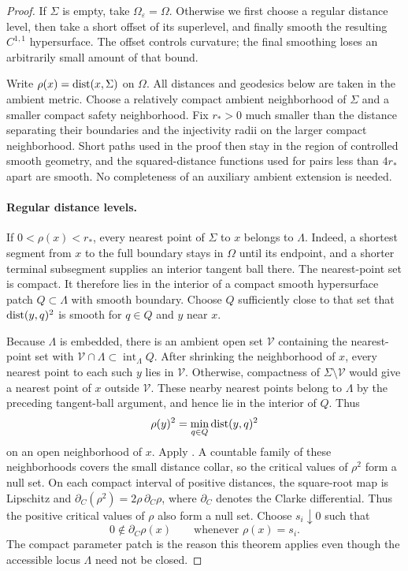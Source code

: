 \begin{proof}
If $\Sigma$ is empty, take $\Omega_\varepsilon=\Omega$.
Otherwise we first choose a regular distance level, then take a short offset
of its superlevel, and finally smooth the resulting $C^{1,1}$
hypersurface. The offset controls curvature; the final smoothing
loses an arbitrarily small amount of that bound.

Write $\rho(x)=\operatorname{dist}(x,\Sigma)$ on $\Omega$. All distances and
geodesics below are taken in the ambient metric. Choose a relatively
compact ambient neighborhood of $\Sigma$ and a smaller compact safety
neighborhood. Fix $r_*>0$ much smaller than the distance separating
their boundaries and the injectivity radii on the larger compact
neighborhood. Short paths used in the proof then stay in the region
of controlled smooth geometry, and the squared-distance functions
used for pairs less than $4r_*$ apart are smooth. No completeness of
an auxiliary ambient extension is needed.

\paragraph{Regular distance levels.}
If $0<\rho(x)<r_*$, every nearest point of $\Sigma$ to $x$ belongs to
$\Lambda$. Indeed, a shortest segment from $x$ to the full boundary
stays in $\Omega$ until its endpoint, and a shorter terminal subsegment
supplies an interior tangent ball there. The nearest-point set is
compact. It therefore lies in the interior of a compact smooth
hypersurface patch $Q\subset\Lambda$ with smooth boundary. Choose
$Q$ sufficiently close to that set that
$\operatorname{dist}(y,q)^2$ is smooth for $q\in Q$ and $y$ near $x$.

Because $\Lambda$ is embedded, there is an ambient open set
$\mathcal V$ containing the nearest-point set with
$\mathcal V\cap\Lambda\subset\operatorname{int}_{\Lambda}Q$.
After shrinking the neighborhood of $x$, every nearest point to each
such $y$ lies in $\mathcal V$. Otherwise, compactness of
$\Sigma\setminus\mathcal V$ would give a nearest point of $x$
outside $\mathcal V$. These nearby nearest points belong to
$\Lambda$ by the preceding tangent-ball argument, and hence lie
in the interior of $Q$. Thus
\[
 \rho(y)^2=\min_{q\in Q}\operatorname{dist}(y,q)^2
\]
on an open neighborhood of $x$. Apply
\cite[Theorem~3 and the compact-parameter-with-boundary extension
in the proof of Theorem~1]{Rifford2004}. A countable family of these
neighborhoods covers the small distance collar, so the critical
values of $\rho^2$ form a null set. On each compact interval of
positive distances, the square-root map is Lipschitz and
$\partial_C(\rho^2)=2\rho\,\partial_C\rho$, where $\partial_C$
denotes the Clarke differential. Thus the positive critical values
of $\rho$ also form a null set. Choose $s_i\downarrow0$ such that
\[
 0\notin\partial_C\rho(x)\qquad\text{whenever }\rho(x)=s_i.
\]
The compact parameter patch is the reason this theorem applies even
though the accessible locus $\Lambda$ need not be closed.


\end{proof}
